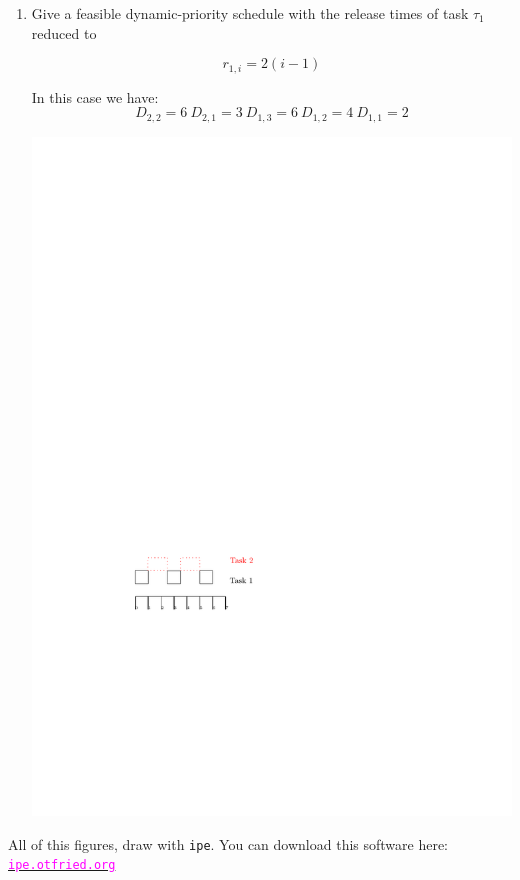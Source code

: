 \documentclass[12pt]{article}
\begin{document}
\begin{enumerate}
	\item 
	Give a feasible dynamic-priority schedule with the release times of task $\tau_1$
	reduced to
	
	$$ r_{1,i}=2(i-1) $$
	
	\begin{qsolve}
		In this case we have: 
		$$ D_{2,2}=6\ D_{2,1}=3\ D_{1,3}=6\ D_{1,2}=4\ D_{1,1}=2 $$
		\begin{center}
			\includegraphics*[width=0.4\linewidth]{images/Q5/c.pdf}
		\end{center}
	\end{qsolve}
\end{enumerate}



\vspace*{\fill}
\begin{center}
	\makeendpage
	All of this figures, draw with \texttt{ipe}. You can download this software here:\\
	\href{https://ipe.otfried.org/}{\textcolor{magenta}{\texttt{ipe.otfried.org}}}

\end{center}
\vfill %
\clearpage
\end{document}
